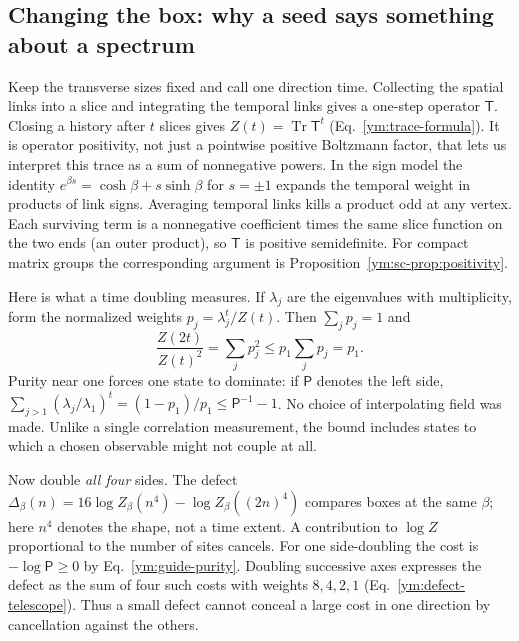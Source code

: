 \subsection{Changing the box: why a seed says something about a spectrum}
Keep the transverse sizes fixed and call one direction time. Collecting the
spatial links into a slice and integrating the temporal links gives a
one-step operator $\mathsf T$. Closing a history after $t$ slices gives
$Z(t)=\operatorname{Tr}\mathsf T^t$ (Eq.~\eqref{ym:trace-formula}). It is
operator positivity, not just a pointwise positive Boltzmann factor, that
lets us interpret this trace as a sum of nonnegative powers. In the sign
model the identity $e^{\beta s}=\cosh\beta+s\sinh\beta$ for $s=\pm1$
expands the temporal weight in products of link signs. Averaging temporal
links kills a product odd at any vertex. Each surviving term is a
nonnegative coefficient times the same slice function on the two ends
(an outer product), so $\mathsf T$ is positive semidefinite. For compact
matrix groups the corresponding argument is Proposition~\ref{ym:sc-prop:positivity}.

Here is what a time doubling measures. If $\lambda_j$ are the eigenvalues
with multiplicity, form the normalized weights $p_j=\lambda_j^t/Z(t)$.
Then $\sum_j p_j=1$ and
\begin{equation}\label{ym:guide-purity}
 \frac{Z(2t)}{Z(t)^2}=\sum_j p_j^2\le p_1\sum_j p_j=p_1.
\end{equation}
Purity near one forces one state to dominate: if $\mathsf P$ denotes the
left side, $\sum_{j>1}(\lambda_j/\lambda_1)^t=(1-p_1)/p_1\le
\mathsf P^{-1}-1$. No choice of interpolating field was made. Unlike a
single correlation measurement, the bound includes states to which a
chosen observable might not couple at all.

Now double \emph{all four} sides. The defect
$\Delta_\beta(n)=16\log Z_\beta(n^4)-\log Z_\beta((2n)^4)$ compares
boxes at the same $\beta$; here $n^4$ denotes the shape, not a time extent.
A contribution to $\log Z$ proportional to the number of sites cancels.
For one side-doubling the cost is $-\log\mathsf P\ge0$ by
Eq.~\eqref{ym:guide-purity}. Doubling successive axes expresses the defect
as the sum of four such costs with weights $8,4,2,1$
(Eq.~\eqref{ym:defect-telescope}). Thus a small defect cannot conceal
a large cost in one direction by cancellation against the others.

